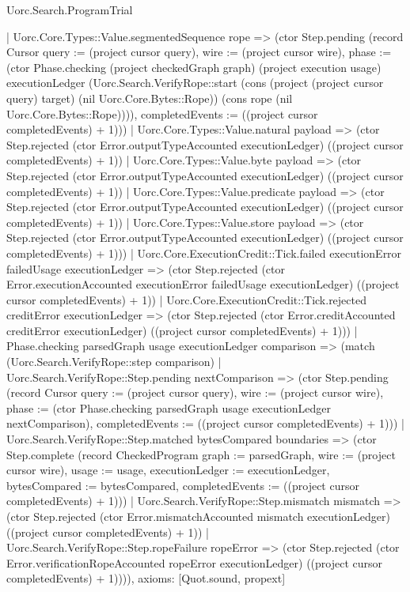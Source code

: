 \begin{lexlean}{Uorc.Search.ProgramTrial}
\begin{semanticmodule}
{        | Uorc.Core.Types::Value.segmentedSequence rope => (ctor Step.pending (record Cursor {query := (project cursor query), wire := (project cursor wire), phase := (ctor Phase.checking (project checkedGraph graph) (project execution usage) executionLedger (Uorc.Search.VerifyRope::start (cons (project (project cursor query) target) (nil Uorc.Core.Bytes::Rope)) (cons rope (nil Uorc.Core.Bytes::Rope)))), completedEvents := ((project cursor completedEvents) + 1)}))
        | Uorc.Core.Types::Value.natural payload => (ctor Step.rejected (ctor Error.outputTypeAccounted executionLedger) ((project cursor completedEvents) + 1))
        | Uorc.Core.Types::Value.byte payload => (ctor Step.rejected (ctor Error.outputTypeAccounted executionLedger) ((project cursor completedEvents) + 1))
        | Uorc.Core.Types::Value.predicate payload => (ctor Step.rejected (ctor Error.outputTypeAccounted executionLedger) ((project cursor completedEvents) + 1))
        | Uorc.Core.Types::Value.store payload => (ctor Step.rejected (ctor Error.outputTypeAccounted executionLedger) ((project cursor completedEvents) + 1)))
      | Uorc.Core.ExecutionCredit::Tick.failed executionError failedUsage executionLedger => (ctor Step.rejected (ctor Error.executionAccounted executionError failedUsage executionLedger) ((project cursor completedEvents) + 1))
      | Uorc.Core.ExecutionCredit::Tick.rejected creditError executionLedger => (ctor Step.rejected (ctor Error.creditAccounted creditError executionLedger) ((project cursor completedEvents) + 1)))
    | Phase.checking parsedGraph usage executionLedger comparison => (match (Uorc.Search.VerifyRope::step comparison)
      | Uorc.Search.VerifyRope::Step.pending nextComparison => (ctor Step.pending (record Cursor {query := (project cursor query), wire := (project cursor wire), phase := (ctor Phase.checking parsedGraph usage executionLedger nextComparison), completedEvents := ((project cursor completedEvents) + 1)}))
      | Uorc.Search.VerifyRope::Step.matched bytesCompared boundaries => (ctor Step.complete (record CheckedProgram {graph := parsedGraph, wire := (project cursor wire), usage := usage, executionLedger := executionLedger, bytesCompared := bytesCompared, completedEvents := ((project cursor completedEvents) + 1)}))
      | Uorc.Search.VerifyRope::Step.mismatch mismatch => (ctor Step.rejected (ctor Error.mismatchAccounted mismatch executionLedger) ((project cursor completedEvents) + 1))
      | Uorc.Search.VerifyRope::Step.ropeFailure ropeError => (ctor Step.rejected (ctor Error.verificationRopeAccounted ropeError executionLedger) ((project cursor completedEvents) + 1)))),
  axioms: [Quot.sound, propext]
}


\end{semanticmodule}
\end{lexlean}

